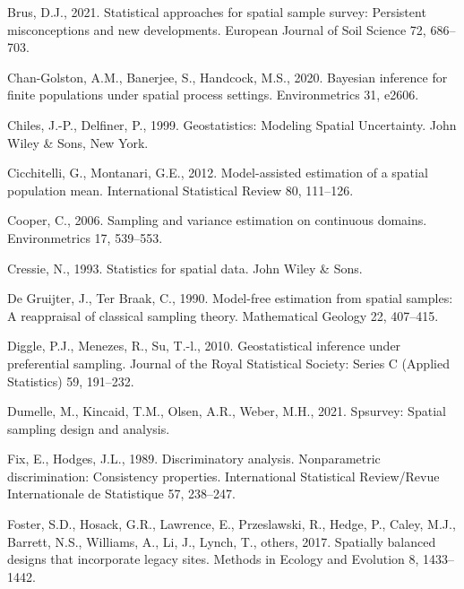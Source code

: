 \documentclass[]{elsarticle} %
\begin{document}
\leavevmode\hypertarget{ref-brus2021statistical}{}%
Brus, D.J., 2021. Statistical approaches for spatial sample survey:
Persistent misconceptions and new developments. European Journal of Soil
Science 72, 686--703.

\leavevmode\hypertarget{ref-chan2020bayesian}{}%
Chan-Golston, A.M., Banerjee, S., Handcock, M.S., 2020. Bayesian
inference for finite populations under spatial process settings.
Environmetrics 31, e2606.

\leavevmode\hypertarget{ref-chiles1999geostatistics}{}%
Chiles, J.-P., Delfiner, P., 1999. Geostatistics: Modeling Spatial
Uncertainty. John Wiley \& Sons, New York.

\leavevmode\hypertarget{ref-cicchitelli2012model}{}%
Cicchitelli, G., Montanari, G.E., 2012. Model-assisted estimation of a
spatial population mean. International Statistical Review 80, 111--126.

\leavevmode\hypertarget{ref-cooper2006sampling}{}%
Cooper, C., 2006. Sampling and variance estimation on continuous
domains. Environmetrics 17, 539--553.

\leavevmode\hypertarget{ref-cressie1993statistics}{}%
Cressie, N., 1993. Statistics for spatial data. John Wiley \& Sons.

\leavevmode\hypertarget{ref-de1990model}{}%
De Gruijter, J., Ter Braak, C., 1990. Model-free estimation from spatial
samples: A reappraisal of classical sampling theory. Mathematical
Geology 22, 407--415.

\leavevmode\hypertarget{ref-diggle2010geostatistical}{}%
Diggle, P.J., Menezes, R., Su, T.-l., 2010. Geostatistical inference
under preferential sampling. Journal of the Royal Statistical Society:
Series C (Applied Statistics) 59, 191--232.

\leavevmode\hypertarget{ref-dumelle2021spsurvey}{}%
Dumelle, M., Kincaid, T.M., Olsen, A.R., Weber, M.H., 2021. Spsurvey:
Spatial sampling design and analysis.

\leavevmode\hypertarget{ref-fix1989discriminatory}{}%
Fix, E., Hodges, J.L., 1989. Discriminatory analysis. Nonparametric
discrimination: Consistency properties. International Statistical
Review/Revue Internationale de Statistique 57, 238--247.

\leavevmode\hypertarget{ref-foster2017spatially}{}%
Foster, S.D., Hosack, G.R., Lawrence, E., Przeslawski, R., Hedge, P.,
Caley, M.J., Barrett, N.S., Williams, A., Li, J., Lynch, T., others,
2017. Spatially balanced designs that incorporate legacy sites. Methods
in Ecology and Evolution 8, 1433--1442.
\end{document}
